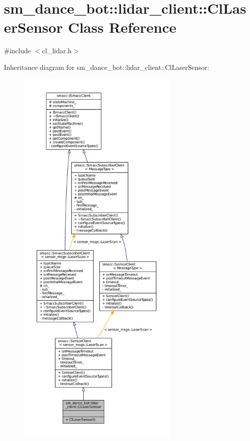 \hypertarget{classsm__dance__bot_1_1lidar__client_1_1ClLaserSensor}{}\section{sm\+\_\+dance\+\_\+bot\+:\+:lidar\+\_\+client\+:\+:Cl\+Laser\+Sensor Class Reference}
\label{classsm__dance__bot_1_1lidar__client_1_1ClLaserSensor}


{\ttfamily \#include $<$cl\+\_\+lidar.\+h$>$}



Inheritance diagram for sm\+\_\+dance\+\_\+bot\+:\+:lidar\+\_\+client\+:\+:Cl\+Laser\+Sensor\+:
\nopagebreak
\begin{figure}[H]
\begin{center}
\leavevmode
\includegraphics[height=550pt]{classsm__dance__bot_1_1lidar__client_1_1ClLaserSensor__inherit__graph}
\end{center}
\end{figure}


